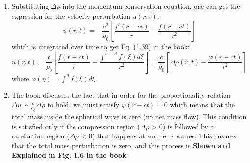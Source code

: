 ﻿\documentclass[11pt]{article}
\begin{document}
\begin{enumerate}
    \item Substituting $\Delta \rho$ into the momentum conservation equation, one can get the expression for the velocity perturbation $u(r,t)$:
    \begin{equation}
      u(r,t) = -\frac{c^2}{\rho_0}\left[\frac{f'(r-ct)}{r}-\frac{f(r-ct)}{r^2}\right]
    \end{equation}
    which is integrated over time to get Eq. (1.39) in the book:
    \begin{equation}
      u(r,t) = \frac{c}{\rho_0} \left[ \frac{f(r-ct)}{r} - \frac{\int^{r-ct}f(\xi)d\xi}{r^2} \right] = \frac{c}{\rho_0} \left[ \Delta \rho(r,t) - \frac{\varphi(r-ct)}{r^2}\right]
    \end{equation}
    where $\varphi(\eta) = \int^{\eta} f(\xi) d\xi$.
    \item The book discusses the fact that in order for the proportionality relation $\Delta u \sim \frac{c}{\rho_0} \Delta \rho$ to hold, we must satisfy $\varphi(r-ct) = 0$ which means that the total mass inside the spherical wave is zero (no net mass flow). This condition is satisfied only if the compression region ($\Delta \rho$ > 0) is followed by a rarefaction region ($\Delta \rho$ < 0) that happens at smaller $r$ values. This ensures that the total mass perturbation is zero, and this process is \textbf{Shown and Explained in Fig. 1.6 in the book}.
  \end{enumerate}
\end{document}
